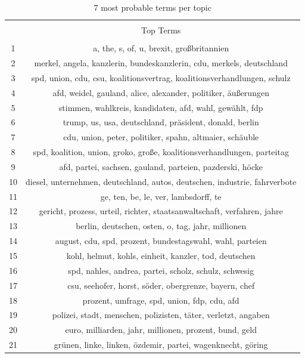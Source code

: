 \documentclass[
]{article}
\begin{document}
\begin{table}[!htbp] \centering 
  \caption{7 most probable terms per topic} 
  \label{table:top_terms} 
\begin{tabular}{@{\extracolsep{5pt}} cc} 
\\[-1.8ex]\hline 
\hline \\[-1.8ex] 
 & Top Terms \\ 
\hline \\[-1.8ex] 
1 & a, the, s, of, u, brexit, großbritannien \\ 
2 & merkel, angela, kanzlerin, bundeskanzlerin, cdu, merkels, deutschland \\ 
3 & spd, union, cdu, csu, koalitionsvertrag, koalitionsverhandlungen, schulz \\ 
4 & afd, weidel, gauland, alice, alexander, politiker, äußerungen \\ 
5 & stimmen, wahlkreis, kandidaten, afd, wahl, gewählt, fdp \\ 
6 & trump, us, usa, deutschland, präsident, donald, berlin \\ 
7 & cdu, union, peter, politiker, spahn, altmaier, schäuble \\ 
8 & spd, koalition, union, groko, große, koalitionsverhandlungen, parteitag \\ 
9 & afd, partei, sachsen, gauland, parteien, pazderski, höcke \\ 
10 & diesel, unternehmen, deutschland, autos, deutschen, industrie, fahrverbote \\ 
11 & ge, ten, be, le, ver, lambsdorff, te \\ 
12 & gericht, prozess, urteil, richter, staatsanwaltschaft, verfahren, jahre \\ 
13 & berlin, deutschen, osten, o, tag, jahr, millionen \\ 
14 & august, cdu, spd, prozent, bundestagswahl, wahl, parteien \\ 
15 & kohl, helmut, kohls, einheit, kanzler, tod, deutschen \\ 
16 & spd, nahles, andrea, partei, scholz, schulz, schwesig \\ 
17 & csu, seehofer, horst, söder, obergrenze, bayern, chef \\ 
18 & prozent, umfrage, spd, union, fdp, cdu, afd \\ 
19 & polizei, stadt, menschen, polizisten, täter, verletzt, angaben \\ 
20 & euro, milliarden, jahr, millionen, prozent, bund, geld \\ 
21 & grünen, linke, linken, özdemir, partei, wagenknecht, göring \\ 

\end{tabular}
\end{table}
\end{document}
